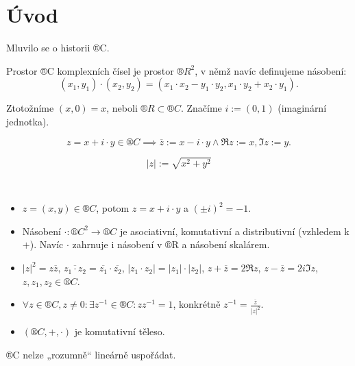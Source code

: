 \documentclass[12pt]{article}					%
\begin{document}
\section*{Úvod}

\begin{poznamka}
	Mluvilo se o historii ®C.
\end{poznamka}

\begin{definice}[Prostor ®C]
	Prostor ®C komplexních čísel je prostor $®R^2$, v němž navíc definujeme násobení:
	$$ (x_1, y_1) \cdot (x_2, y_2) = (x_1·x_2 - y_1·y_2, x_1·y_2 + x_2·y_1). $$

	Ztotožníme $(x, 0) = x$, neboli $®R \subset ®C$. Značíme $i := (0, 1)$ (imaginární jednotka).
\end{definice}

\begin{definice}
	$$ z = x + i·y \in ®C \implies \overline{z}:= x - i·y \land \Re z := x, \Im z := y. $$
\end{definice}

\begin{definice}
	$$ |z| := \sqrt{x^2 + y^2} $$
\end{definice}

\begin{tvrzeni}[Vlastnosti]
	\ 
	\begin{itemize}
		\item $z = (x, y) \in ®C$, potom $z = x + i·y$ a $(±i)^2 = -1$.
		\item Násobení $·: ®C^2 \rightarrow ®C$ je asociativní, komutativní a distributivní (vzhledem k $+$). Navíc $·$ zahrnuje i násobení v ®R a násobení skalárem.
		\item $|z|^2 = z \overline{z}$, $\overline{z_1 · z_2} = \overline{z_1}·\overline{z_2}$, $|z_1·z_2| = |z_1|·|z_2|$, $z + \overline{z} = 2 \Re z$, $z - \overline{z} = 2i\Im z$, $z, z_1, z_2 \in ®C$.
		\item $\forall z \in ®C, z ≠ 0: \exists z^{-1} \in ®C: z z^{-1} = 1$, konkrétně $z^{-1} = \frac{\overline{z}}{|z|^2}$.
		\item $(®C, +, ·)$ je komutativní těleso.
	\end{itemize}
\end{tvrzeni}

\begin{upozorneni}
	®C nelze „rozumně“ lineárně uspořádat.
\end{upozorneni}
\end{document}
